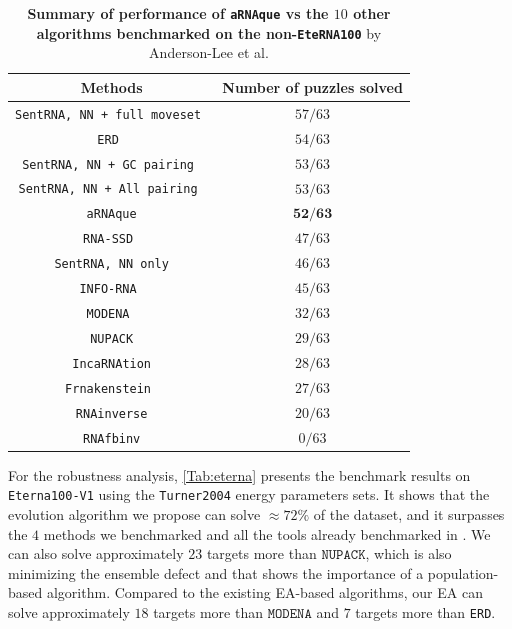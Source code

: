 \begin{center}
	\begin{table}[t!]
		\caption{{\textbf{Summary of performance of \texttt{aRNAque} vs the $10$ other algorithms benchmarked on the non-\texttt{EteRNA100}} by Anderson-Lee et al. \cite{anderson2016principles} }} \label{Tab:non-eterna}
		\centering
		\begin{tabular}[t!]{|c|c|}
			\hline
			\textbf{Methods}& Number of puzzles solved\\
			\hline
			\texttt{SentRNA, NN + full moveset }&$57/63$\\
			\hline
			\texttt{ERD }&$54/63$\\
			\hline
			\texttt{SentRNA, NN + GC pairing }&$53/63$\\
			\hline
			\texttt{SentRNA, NN + All pairing }&$53/63$\\
			\hline
			\texttt{aRNAque}&$\textbf{52/63}$\\
			\hline
			\texttt{RNA-SSD }&$47/63$\\
			\hline
			\texttt{SentRNA, NN only}&$46/63$\\
			\hline
			\texttt{INFO-RNA }&$45/63$\\
			\hline
			\texttt{MODENA }&$32/63$\\
			\hline
			\texttt{NUPACK}&$29/63$\\
			\hline
			\texttt{IncaRNAtion}&$28/63$\\
			\hline
			\texttt{Frnakenstein }&$27/63$\\
			\hline
			\texttt{RNAinverse}&$20/63$\\
			\hline
			\texttt{RNAfbinv}&$0/63$\\
			\hline
		\end{tabular}
	\end{table}
\end{center}
For the robustness analysis, {\autoref{Tab:eterna}} presents the benchmark results on \texttt{Eterna100-V1} using the \texttt{Turner2004} energy parameters sets. It shows that the evolution algorithm we propose can solve \(\)\(\approx72\%\) of the dataset, and it surpasses the \(4\) methods we benchmarked and all the tools already benchmarked in \cite{shi2018sentrna}. We can also solve approximately \(23\) targets more than \(\texttt{NUPACK}\), which is also minimizing the ensemble defect and that shows the importance of a population-based algorithm. Compared to the existing \ac{EA}-based algorithms, our \ac{EA} can solve approximately \(18\) targets more than \(\texttt{MODENA}\) and $7$ targets more than \texttt{ERD}.

